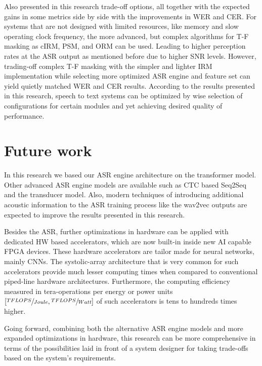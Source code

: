 \bigskip

Also presented in this research trade-off options,
all together with the expected gains in some metrics
side by side with the improvements in WER and CER.
For systems that are not designed with limited resources,
like memory and slow operating clock frequency, 
the more advanced, but complex algorithms for T-F masking
as cIRM, PSM, and ORM can be used.
Leading to higher perception rates at the ASR output
as mentioned before due to higher SNR levels. However,
trading-off complex T-F masking with the simpler and
lighter IRM implementation while selecting more optimized
ASR engine and feature set can yield quietly matched
WER and CER results. According to the results presented
in this research, speech to text systems can be optimized
by wise selection 
of configurations for certain
modules and yet achieving desired quality of performance.


\section{Future work}
In this research we based our ASR engine
architecture on the transformer model.
Other advanced ASR engine models are available
such as CTC based Seq2Seq and the transducer model.
Also, modern techniques of introducing 
additional acoustic information to the ASR training process
like the wav2vec outputs are expected to improve the results presented
in this research. 

Besides the ASR, further optimizations in hardware
can be applied with dedicated HW based accelerators,
which are now built-in inside new AI capable FPGA devices.
These hardware accelerators are tailor made for
neural networks, mainly CNNs. 
The systolic-array architecture that is very common
for such accelerators provide much lesser computing times
when compared to conventional piped-line hardware architectures.
Furthermore, the computing efficiency measured in
tera-operations per energy or power units
\([\sfrac{TFLOPS}{Joule}, \sfrac{TFLOPS}{Watt}]\) of such accelerators
is tens to hundreds times higher.

Going forward, combining both
the alternative ASR engine models 
and more expanded optimizations in hardware,
this research can be more comprehensive in terms of
the possibilities laid in front of a system designer
for taking trade-offs based on the system's requirements.
